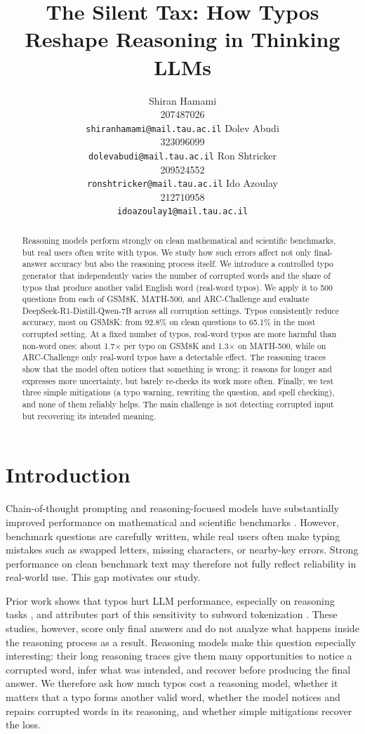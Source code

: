 \documentclass[11pt]{article}
\title{The Silent Tax: How Typos Reshape Reasoning in Thinking LLMs}
\author{Shiran Hamami \\ 207487026 \\ \texttt{shiranhamami@mail.tau.ac.il} \And
Dolev Abudi \\ 323096099 \\ \texttt{dolevabudi@mail.tau.ac.il} \AND
Ron Shtricker \\ 209524552 \\ \texttt{ronshtricker@mail.tau.ac.il} \And
Ido Azoulay \\ 212710958 \\ \texttt{idoazoulay1@mail.tau.ac.il}}
\begin{document}
\maketitle
\begin{abstract}
Reasoning models perform strongly on clean mathematical and scientific benchmarks, but real users often write with typos. We study how such errors affect not only final-answer accuracy but also the reasoning process itself. We introduce a controlled typo generator that independently varies the number of corrupted words and the share of typos that produce another valid English word (real-word typos). We apply it to 500 questions from each of GSM8K, MATH-500, and ARC-Challenge and evaluate DeepSeek-R1-Distill-Qwen-7B across all corruption settings. Typos consistently reduce accuracy, most on GSM8K: from 92.8\% on clean questions to 65.1\% in the most corrupted setting. At a fixed number of typos, real-word typos are more harmful than non-word ones: about 1.7$\times$ per typo on GSM8K and 1.3$\times$ on MATH-500, while on ARC-Challenge only real-word typos have a detectable effect. The reasoning traces show that the model often notices that something is wrong: it reasons for longer and expresses more uncertainty, but barely re-checks its work more often. Finally, we test three simple mitigations (a typo warning, rewriting the question, and spell checking), and none of them reliably helps. The main challenge is not detecting corrupted input but recovering its intended meaning.
\end{abstract}

\section{Introduction}

Chain-of-thought prompting and reasoning-focused models have substantially improved performance on mathematical and scientific benchmarks \citep{wei2022,guo2025}. However, benchmark questions are carefully written, while real users often make typing mistakes such as swapped letters, missing characters, or nearby-key errors. Strong performance on clean benchmark text may therefore not fully reflect reliability in real-world use. This gap motivates our study.

Prior work shows that typos hurt LLM performance, especially on reasoning tasks \citep{gan2024,zhao2026}, and attributes part of this sensitivity to subword tokenization \citep{chai2024}. These studies, however, score only final answers and do not analyze what happens inside the reasoning process as a result. Reasoning models make this question especially interesting: their long reasoning traces give them many opportunities to notice a corrupted word, infer what was intended, and recover before producing the final answer. We therefore ask how much typos cost a reasoning model, whether it matters that a typo forms another valid word, whether the model notices and repairs corrupted words in its reasoning, and whether simple mitigations recover the loss.
\end{document}
